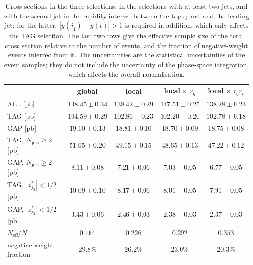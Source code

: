 \documentclass[a4paper,11pt]{article}
\newcommand{\glob}{global\xspace}
\newcommand{\loc}{local\xspace}
\newcommand{\locq}{local$\,{\times}\,r_q$\xspace}
\newcommand{\locqt}{local$\,{\times}\,r_qr_t$\xspace}
\begin{document}
\begin{table}[t]
  \centering
  \begin{tabular}{@{}lcccc@{}}
    \toprule
    & \glob & \loc & \locq & \locqt\\
    \midrule
    ALL [pb] & $138.45\pm0.34$ & $138.42\pm0.29$ & $137.51\pm0.25$ & $138.28\pm0.23$\\
    TAG [pb] & $104.59\pm0.29$ & $102.86\pm0.23$ & $102.20\pm0.20$ & $102.78\pm0.18$\\
    GAP [pb] & $19.10\pm0.13$ & $18.81\pm0.10$ & $18.70\pm0.09$ & $18.75\pm0.08$\\
    \midrule
    TAG, $N_{\mathrm{jets}}\ge2$ [pb] & $51.65\pm0.20$ & $49.15\pm0.15$ & $48.65\pm0.13$ & $47.22\pm0.12$\\
    GAP, $N_{\mathrm{jets}}\ge2$ [pb] & $8.11\pm0.08$ & $7.21\pm0.06$ & $7.03\pm0.05$ & $6.77\pm0.05$\\
    TAG, $|z^*_{j_2}|<1/2$ [pb] & $10.09\pm0.10$ & $8.17\pm0.06$ & $8.01\pm0.05$ & $7.91\pm0.05$\\
    GAP, $|z^*_{j_2}|<1/2$ [pb] & $3.43\pm0.06$ & $2.46\pm0.03$ & $2.38\pm0.03$ & $2.37\pm0.03$\\
    \midrule
    $N_{\mathrm{eff}}/N$ & $0.164$ & $0.226$ & $0.292$ & $0.353$\\
    negative-weight fraction & $29.8\%$ & $26.2\%$ & $23.0\%$ & $20.3\%$\\
    \bottomrule
  \end{tabular}
  \caption{Cross sections in the three selections, in the selections
    with at least two jets, and with the second jet in the rapidity
    interval between the top quark and the leading jet; for the latter,
    $|y(j_1)-y(t)|>1$ is required in addition, which only affects the
    TAG selection. The last two rows give the effective sample size of
    the total cross section relative to the number of events, and the
    fraction of negative-weight events inferred from it. The
    uncertainties are the statistical uncertainties of the event
    samples; they do not include the uncertainty of the phase-space
    integration, which affects the overall normalisation.}
  \label{tab:rates}
\end{table}
\end{document}
